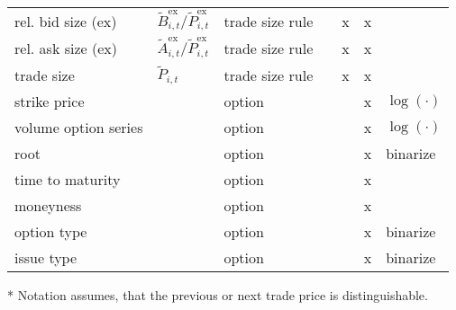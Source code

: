 \begin{threeparttable}
\begin{tabular}{@{}lllllll@{}}
        rel. bid size (ex)        & $\tilde{B}_{i, t}^{\text{ex}}/\tilde{P}_{i, t}^{\text{ex}}$                                                                          & trade size rule      &      & x    & x    &               \\
        rel. ask size (ex)        & $\tilde{A}_{i, t}^{\text{ex}}/\tilde{P}_{i, t}^{\text{ex}}$                                                                          & trade size rule      &      & x    & x    &               \\
        trade size                & $\tilde{P}_{i, t}$                                                                                                                   & trade size rule      &      & x    & x    &               \\
        strike price              &                                                                                                                                      & option               &      &      & x    & $\log(\cdot)$ \\
        volume option series      &                                                                                                                                      & option               &      &      & x    & $\log(\cdot)$ \\
        root                      &                                                                                                                                      & option               &      &      & x    & binarize      \\
        time to maturity          &                                                                                                                                      & option               &      &      & x    &               \\
        moneyness                 &                                                                                                                                      & option               &      &      & x    &               \\
        option type               &                                                                                                                                      & option               &      &      & x    & binarize      \\
        issue type                &                                                                                                                                      & option               &      &      & x    & binarize      \\ \bottomrule
    \end{tabular}
    \begin{tablenotes}\footnotesize
        \item[*] Notation assumes, that the previous or next trade price is distinguishable.
    \end{tablenotes}
\end{threeparttable}